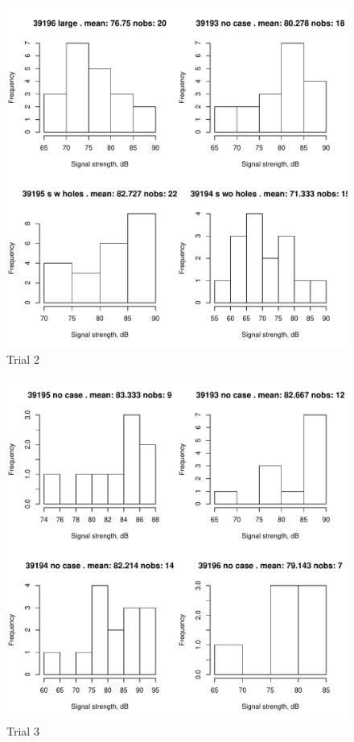 \documentclass{article}
\begin{document}
\begin{figure}
  \begin{center}
    \includegraphics[trim=0cm 0cm 0cm 0cm,clip,angle=0,width=1\textwidth]{experiment1/casesTrial2.pdf}
  \end{center}
  \caption{Trial 2}
\label{fig:ex1t2}
\end{figure}

\begin{figure}
  \begin{center}
    \includegraphics[trim=0cm 0cm 0cm 0cm,clip,angle=0,width=1\textwidth]{experiment1/casesTrial3.pdf}
  \end{center}
  \caption{Trial 3}
\label{fig:ex1t3}
\end{figure}
\end{document}

